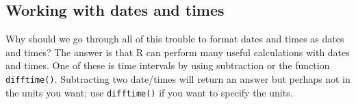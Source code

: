 \documentclass[
  13,
  letterpaper,
]{report}
\newenvironment{Shaded}{\begin{snugshade}}{\end{snugshade}}
\newcommand{\AttributeTok}[1]{\textcolor[rgb]{0.40,0.45,0.13}{#1}}
\newcommand{\CommentTok}[1]{\textcolor[rgb]{0.37,0.37,0.37}{#1}}
\newcommand{\DocumentationTok}[1]{\textcolor[rgb]{0.37,0.37,0.37}{\textit{#1}}}
\newcommand{\FunctionTok}[1]{\textcolor[rgb]{0.28,0.35,0.67}{#1}}
\newcommand{\NormalTok}[1]{\textcolor[rgb]{0.00,0.23,0.31}{#1}}
\newcommand{\OtherTok}[1]{\textcolor[rgb]{0.00,0.23,0.31}{#1}}
\newcommand{\SpecialCharTok}[1]{\textcolor[rgb]{0.37,0.37,0.37}{#1}}
\newcommand{\StringTok}[1]{\textcolor[rgb]{0.13,0.47,0.30}{#1}}
\begin{document}
\begin{Shaded}
\end{Shaded}

\subsection{Working with dates and times}\label{sec-manip-date-work}

Why should we go through all of this trouble to format dates and times
as dates and times? The answer is that R can perform many useful
calculations with dates and times. One of these is time intervals by
using subtraction or the function \texttt{difftime()}. Subtracting two
date/times will return an answer but perhaps not in the units you want;
use \texttt{difftime()} if you want to specify the units.
\end{document}
